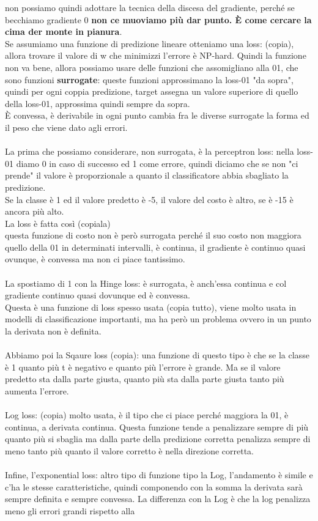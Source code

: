 \documentclass[12pt, oneside]{extbook}
\begin{document}
non possiamo quindi adottare la tecnica della discesa del gradiente, perché se becchiamo gradiente 0 \textbf{non ce muoviamo più dar punto. È come cercare la cima der monte in pianura}.\\Se assumiamo una funzione di predizione lineare otteniamo una loss: (copia), allora trovare il valore di w che minimizzi l'errore è NP-hard. Quindi la funzione non va bene, allora possiamo usare delle funzioni che assomigliano alla 01, che sono funzioni \textbf{surrogate}: queste funzioni approssimano la loss-01 "da sopra", quindi per ogni coppia predizione, target assegna un valore superiore di quello della loss-01, approssima quindi sempre da sopra.\\È convessa, è derivabile in ogni punto cambia fra le diverse surrogate la forma ed il peso che viene dato agli errori.\\\\La prima che possiamo considerare, non surrogata, è la perceptron loss: nella loss-01 diamo 0 in caso di successo ed 1 come errore, quindi diciamo che se non "ci prende" il valore è proporzionale a quanto il classificatore abbia sbagliato la predizione.\\Se la classe è 1 ed il valore predetto è -5, il valore del costo è altro, se è -15 è ancora più alto.\\La loss è fatta così (copiala)\\questa funzione di costo non è però surrogata perché il suo costo non maggiora quello della 01 in determinati intervalli, è continua, il gradiente è continuo quasi ovunque, è convessa ma non ci piace tantissimo.\\\\La spostiamo di 1 con la Hinge loss: è surrogata, è anch'essa continua e col gradiente continuo quasi dovunque ed è convessa.\\Questa è una funzione di loss spesso usata (copia tutto), viene molto usata in modelli di classificazione importanti, ma ha però un problema ovvero in un punto la derivata non è definita.\\\\Abbiamo poi la Sqaure loss (copia): una funzione di questo tipo è che se la classe è 1 quanto più t è negativo e quanto più l'errore è grande. Ma se il valore predetto sta dalla parte giusta, quanto più sta dalla parte giusta tanto più aumenta l'errore.\\\\Log loss: (copia) molto usata, è il tipo che ci piace perché maggiora la 01, è continua, a derivata continua. Questa funzione tende a penalizzare sempre di più quanto più si sbaglia ma dalla parte della predizione corretta penalizza sempre di meno tanto più quanto il valore corretto è nella direzione corretta.\\\\Infine, l'exponential loss: altro tipo di funzione tipo la Log, l'andamento è simile e c'ha le stesse caratteristiche, quindi componendo con la somma la derivata sarà sempre definita e sempre convessa. La differenza con la Log è che la log penalizza meno gli errori grandi rispetto alla 
\end{document}

